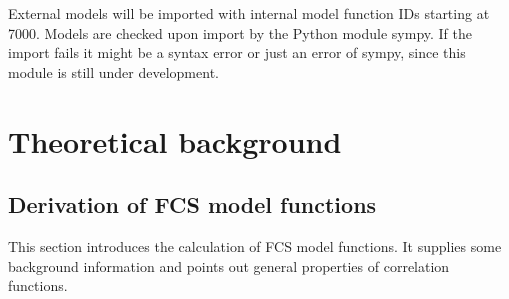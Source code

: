 External models will be imported with internal model function IDs starting at 7000. Models are checked upon import by the Python module sympy. If the import fails it might be a syntax error or just an error of sympy, since this module is still under development. 



\section{Theoretical background}


\subsection{Derivation of FCS model functions}
This section introduces the calculation of FCS model functions. It supplies some background information and points out general properties of correlation functions.
	
